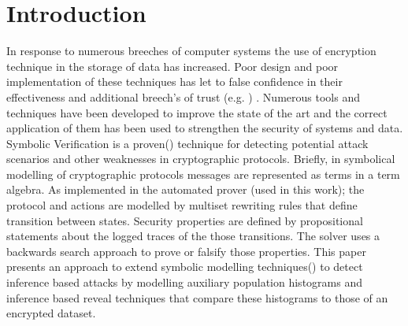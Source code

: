 \documentclass[journal]{IEEEtran}
\begin{document}


\section{Introduction}
In response to numerous breeches\cite{StateOfIS} of computer systems the use of encryption technique in the storage of data has increased\cite{Raghavendra2016}. Poor design and poor implementation of these techniques has let to false confidence in their effectiveness and additional breech's of trust (e.g. \cite{NewSouthWales}) .
Numerous tools and techniques have been developed to improve the state of the  art and the correct application of them has been used to strengthen the security of systems and data\cite{SOK2017}.  
Symbolic Verification is a proven(\cite{Meier2013, 5GAKA, 18XOR}) technique for detecting potential attack scenarios and other weaknesses in cryptographic protocols.
Briefly, in symbolical modelling of cryptographic protocols messages are represented as terms in a term algebra. As implemented in the automated prover \tamarin{}\cite{Meyer2012} (used in this work); the protocol and actions are modelled by multiset rewriting rules that define transition between states. Security properties are defined by propositional statements about the logged traces of the those transitions. The solver uses a backwards search approach to prove or falsify those properties. 
This paper presents an approach to extend symbolic modelling techniques(\cite{Meier2013, ObsEqvCCS15}) to detect inference based attacks by modelling auxiliary population histograms and inference based reveal techniques that compare these histograms to those of an encrypted dataset.
\end{document}
